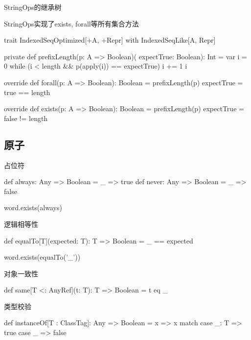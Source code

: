 \begin{frame}[fragile]{StringOps的继承树}
 \begin{block}{StringOps实现了exists, forall等所有集合方法}
  \begin{scala}
trait IndexedSeqOptimized[+A, +Repr] with IndexedSeqLike[A, Repr] {  
  private def prefixLength(p: A => Boolean)(
    expectTrue: Boolean): Int = {
    var i = 0
    while (i < length && p(apply(i)) == expectTrue) i += 1
    i
  }

  override def forall(p: A => Boolean): Boolean = 
    prefixLength(p) { expectTrue = true } == length
  
  override def exists(p: A => Boolean): Boolean = 
    prefixLength(p) { expectTrue = false } != length
}
  \end{scala}
 \end{block}
\end{frame}

\subsection{原子}

\begin{frame}[fragile]{占位符}
  \begin{scala}
def always: Any => Boolean = _ => true
def never:  Any => Boolean = _ => false  

word.exists(always)
  \end{scala}
\end{frame}

\begin{frame}[fragile]{逻辑相等性}
  \begin{scala}
def equalTo[T](expected: T): T => Boolean = _ == expected

word.exists(equalTo('_'))
  \end{scala}
\end{frame}

\begin{frame}[fragile]{对象一致性}
  \begin{scala}
def same[T <: AnyRef](t: T): T => Boolean = t eq _
  \end{scala}
\end{frame}

\begin{frame}[fragile]{类型校验}
  \begin{scala}
def instanceOf[T : ClassTag]: Any => Boolean = x =>
  x match {
    case _: T => true
    case _    => false
  }
  \end{scala}
\end{frame}

